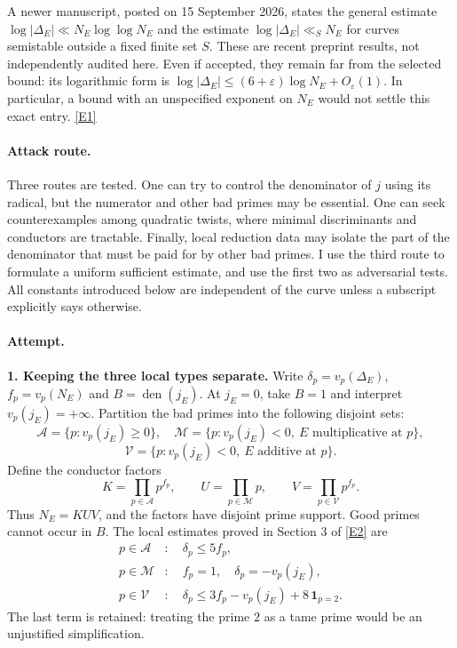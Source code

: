 \documentclass[11pt,a4paper]{article}
\newcommand{\eref}[2]{\hyperlink{extra:#1:#2}{[E#2]}}
\numberwithin{equation}{section}
\begin{document}
A newer manuscript, posted on 15 September 2026, states the general estimate
$\log|\Delta_E|\ll N_E\log\log N_E$ and the estimate
$\log|\Delta_E|\ll_S N_E$ for curves semistable outside a fixed finite set $S$.
These are recent preprint results, not independently audited here. Even if
accepted, they remain far from the selected bound: its logarithmic form is
$\log|\Delta_E|\leq(6+\varepsilon)\log N_E+O_\varepsilon(1)$.
In particular, a bound with an unspecified exponent on $N_E$ would not settle
this exact entry. \eref{statement}{1}

\paragraph{Attack route.}
Three routes are tested. One can try to control the denominator of $j$ using
its radical, but the numerator and other bad primes may be essential. One
can seek counterexamples among quadratic twists, where minimal discriminants
and conductors are tractable. Finally, local reduction data may isolate the
part of the denominator that must be paid for by other bad primes. I use
the third route to formulate a uniform sufficient estimate, and use the
first two as adversarial tests. All constants introduced below are independent
of the curve unless a subscript explicitly says otherwise.

\paragraph{Attempt.}
\textbf{1. Keeping the three local types separate.}
Write $\delta_p=v_p(\Delta_E)$, $f_p=v_p(N_E)$ and
$B=\operatorname{den}(j_E)$. At $j_E=0$, take $B=1$ and interpret
$v_p(j_E)=+\infty$. Partition the bad primes into the following disjoint sets:
\[
 \mathcal A=\{p:v_p(j_E)\geq0\},\quad
 \mathcal M=\{p:v_p(j_E)<0,\ E\text{ multiplicative at }p\},
\]
\[
 \mathcal V=\{p:v_p(j_E)<0,\ E\text{ additive at }p\}.
\]
Define the conductor factors
\begin{equation}\label{statement:factors}
 K=\prod_{p\in\mathcal A}p^{f_p},\qquad
 U=\prod_{p\in\mathcal M}p,\qquad
 V=\prod_{p\in\mathcal V}p^{f_p}.
\end{equation}
Thus $N_E=KUV$, and the factors have disjoint prime support. Good primes
cannot occur in $B$. The local estimates proved in Section 3 of
\eref{statement}{2} are
\begin{align}
 p\in\mathcal A &: \quad\delta_p\leq5f_p,\nonumber\\
 p\in\mathcal M &: \quad f_p=1,\quad\delta_p=-v_p(j_E),\label{statement:local}\\
 p\in\mathcal V &: \quad
 \delta_p\leq3f_p-v_p(j_E)+8\,\mathbf1_{p=2}.\nonumber
\end{align}
The last term is retained: treating the prime $2$ as a tame prime would be
an unjustified simplification.
\end{document}
